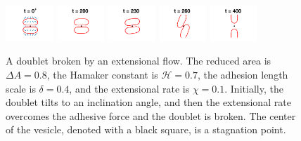 \documentclass[prf,superscriptaddress,showpacs]{revtex4-1}
\begin{document}
\begin{figure}[htp]
  \includegraphics[width = 0.16\textwidth,trim={4cm 2cm 4cm 1cm},clip]{figs/extensional_adR4em1adS7em1Chi1em1_ra080_image01.png}
  \includegraphics[width = 0.16\textwidth,trim={4cm 2cm 4cm 1cm},clip]{figs/extensional_adR4em1adS7em1Chi1em1_ra080_image02.png}
  \includegraphics[width = 0.16\textwidth,trim={4cm 2cm 4cm 1cm},clip]{figs/extensional_adR4em1adS7em1Chi1em1_ra080_image03.png}
  \includegraphics[width = 0.16\textwidth,trim={4cm 2cm 4cm 1cm},clip]{figs/extensional_adR4em1adS7em1Chi1em1_ra080_image04.png}
  \includegraphics[width = 0.16\textwidth,trim={4cm 2cm 4cm 1cm},clip]{figs/extensional_adR4em1adS7em1Chi1em1_ra080_image05.png}
  \caption{\label{fig:extensional4} A doublet broken by an extensional
  flow.  The reduced area is $\Delta A = 0.8$, the Hamaker constant is
  $\mathcal{H} = 0.7$, the adhesion length scale is $\delta = 0.4$, and
  the extensional rate is $\chi = 0.1$.  Initially, the doublet tilts to
  an inclination angle, and then the extensional rate overcomes the
  adhesive force and the doublet is broken.  The center of the vesicle,
  denoted with a black square, is a stagnation point.}
\end{figure}
\end{document}
